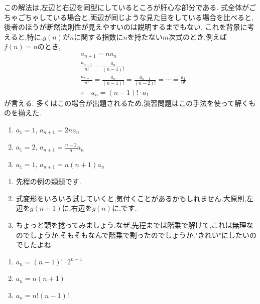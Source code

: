     この解法は,左辺と右辺を同型にしているところが肝心な部分である.
    式全体がごちゃごちゃしている場合と,両辺が同じような見た目をしている場合を比べると,後者のほうが断然法則性が見えやすいのは説明するまでもない.
    これを背景に考えると,特に,$g(n)$が$n$に関する指数に$n$を持たない$m$次式のとき,例えば$f(n)=n$のとき,
    \begin{align*}
      &a_{n+1}=na_n\\
      &\frac{a_{n+1}}{n!}=\frac{a_n}{(n-1)!}\\
      &\frac{a_{n+1}}{n!}=\frac{a_n}{(n-1)!}=\frac{a_{n-1}}{(n-2)!}=\cdots=\frac{a_1}{0!}\\
      &\therefore \quad a_n=(n-1)!\cdot a_1
    \end{align*}
    が言える.
    多くはこの場合が出題されるため,演習問題はこの手法を使って解くものを揃えた.
    
    \noindent {}
    \begin{enumerate}[label=(\arabic*),parsep=3pt,format=\bookitemlink{example-ratio-1}{problem}{answer}]
      \item $\displaystyle a_1=1,\, a_{n+1}=2na_n$
      \item $\displaystyle a_1=2,\, a_{n+1}=\frac{n+2}{n}a_n$
      \item $\displaystyle a_1=1,\, a_{n+1}=n(n+1)a_n$
    \end{enumerate}

    \noindent{}
    \begin{enumerate}[label=(\arabic*),parsep=3pt,format=\bookitemlink{example-ratio-1}{hint}{problem}]
      \item 先程の例の類題です.
      \item 式変形をいろいろ試していくと,気付くことがあるかもしれません.大原則,左辺を$g(n+1)$に,右辺を$g(n)$に,です.
      \item ちょっと頭を捻ってみましょう.なぜ,先程までは階乗で解けて,これは無理なのでしょうか.そもそもなんで階乗で割ったのでしょうか."きれい"にしたいのでしたよね.
    \end{enumerate}

    \noindent{}
    \begin{enumerate}[label=(\arabic*),parsep=3pt,format=\bookitemlink{example-ratio-1}{answer}{problem}]
      \item $\displaystyle a_n=(n-1)!\cdot 2^{n-1}$
      \item $\displaystyle a_n=n(n+1)$
      \item $\displaystyle a_n=n!(n-1)!$
    \end{enumerate}

